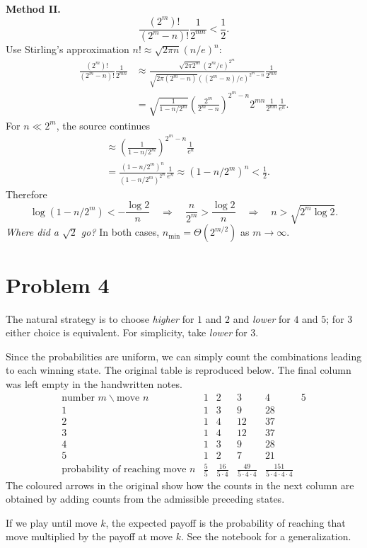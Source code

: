 \documentclass[a4paper]{article}
\begin{document}
\begin{enumerate}
\textbf{Method II.}
\[
\frac{(2^m)!}{(2^m-n)!}\frac1{2^{mn}}<\frac12.
\]
Use Stirling's approximation $n!\approx\sqrt{2\pi n}(n/e)^n$:
\begin{align*}
\frac{(2^m)!}{(2^m-n)!}\frac1{2^{mn}}
&\approx
\frac{\sqrt{2\pi2^m}(2^m/e)^{2^m}}
{\sqrt{2\pi(2^m-n)}((2^m-n)/e)^{2^m-n}}\frac1{2^{mn}}\\
&=\sqrt{\frac1{1-n/2^m}}
\left(\frac{2^m}{2^m-n}\right)^{2^m-n}
2^{mn}\frac1{2^{mn}}\frac1{e^n}.
\end{align*}
For $n\ll2^m$, the source continues
\begin{align*}
&\approx\left(\frac1{1-n/2^m}\right)^{2^m-n}\frac1{e^n}\\
&=\frac{(1-n/2^m)^n}{(1-n/2^m)^{2^m}}\frac1{e^n}
\approx(1-n/2^m)^n<\frac12.
\end{align*}
Therefore
\[
\log(1-n/2^m)<-\frac{\log2}{n}
\quad\Longrightarrow\quad
\frac n{2^m}>\frac{\log2}{n}
\quad\Longrightarrow\quad
n>\sqrt{2^m\log2}.
\]
\textit{Where did a $\sqrt2$ go?}
In both cases, $n_{\min}=\Theta(2^{m/2})$ as $m\to\infty$.
\end{enumerate}

\section*{Problem 4}
The natural strategy is to choose \textit{higher} for $1$ and $2$ and
\textit{lower} for $4$ and $5$; for $3$ either choice is equivalent.
For simplicity, take \textit{lower} for $3$.

Since the probabilities are uniform, we can simply count the combinations
leading to each winning state. The original table is reproduced below.
The final column was left empty in the handwritten notes.
\[
\begin{array}{c|rrrrr}
\text{number }m\backslash\text{move }n&1&2&3&4&5\\ \hline
1&1&3&9&28&\\
2&1&4&12&37&\\
3&1&4&12&37&\\
4&1&3&9&28&\\
5&1&2&7&21&\\ \hline
\text{probability of reaching move }n&
\frac55&\frac{16}{5\cdot4}&\frac{49}{5\cdot4\cdot4}
&\frac{151}{5\cdot4\cdot4\cdot4}&
\end{array}
\]
The coloured arrows in the original show how the counts in the next
column are obtained by adding counts from the admissible preceding
states.

If we play until move $k$, the expected payoff is the probability of
reaching that move multiplied by the payoff at move $k$.
See the notebook for a generalization.
\end{document}
